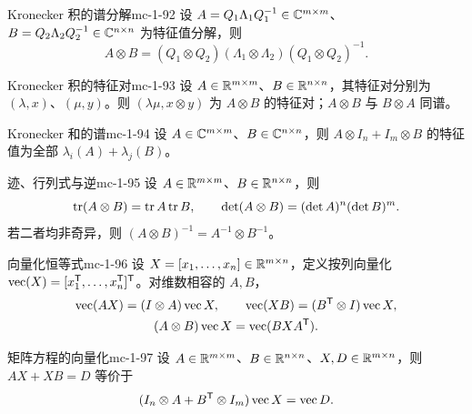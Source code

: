 \begin{corollary}{Kronecker 积的谱分解}{mc-1-92}
设 $A=Q_1\Lambda_1Q_1^{-1}\in\mathbb{C}^{m\times m}$、$B=Q_2\Lambda_2Q_2^{-1}\in\mathbb{C}^{n\times n}$ 为特征值分解，则
\[A\otimes B=(Q_1\otimes Q_2)(\Lambda_1\otimes\Lambda_2)(Q_1\otimes Q_2)^{-1}.\]
\end{corollary}

\begin{theorem}{Kronecker 积的特征对}{mc-1-93}
设 $A\in\mathbb{R}^{m\times m}$、$B\in\mathbb{R}^{n\times n}$，其特征对分别为 $(\lambda,x)$、$(\mu,y)$。则 $(\lambda\mu,x\otimes y)$ 为 $A\otimes B$ 的特征对；$A\otimes B$ 与 $B\otimes A$ 同谱。
\end{theorem}

\begin{corollary}{Kronecker 和的谱}{mc-1-94}
设 $A\in\mathbb{C}^{m\times m}$、$B\in\mathbb{C}^{n\times n}$，则 $A\otimes I_n+I_m\otimes B$ 的特征值为全部 $\lambda_i(A)+\lambda_j(B)$。
\end{corollary}

\begin{theorem}{迹、行列式与逆}{mc-1-95}
设 $A\in\mathbb{R}^{m\times m}$、$B\in\mathbb{R}^{n\times n}$，则
\[\operatorname{tr}(A\otimes B)=\operatorname{tr} A\operatorname{tr} B,\qquad\det(A\otimes B)=(\det A)^n(\det B)^m.\]
若二者均非奇异，则 $(A\otimes B)^{-1}=A^{-1}\otimes B^{-1}$。
\end{theorem}

\begin{theorem}{向量化恒等式}{mc-1-96}
设 $X=[x_1,\ldots,x_n]\in\mathbb{R}^{m\times n}$，定义按列向量化 $\operatorname{vec}(X)=[x_1^{\mathsf T},\ldots,x_n^{\mathsf T}]^{\mathsf T}$。对维数相容的 $A,B$，
\[
\begin{gathered}
\operatorname{vec}(AX)=(I\otimes A)\operatorname{vec} X,\qquad\operatorname{vec}(XB)=(B^{\mathsf T}\otimes I)\operatorname{vec} X,\\
(A\otimes B)\operatorname{vec} X=\operatorname{vec}(BXA^{\mathsf T}).
\end{gathered}
\]
\end{theorem}

\begin{theorem}{矩阵方程的向量化}{mc-1-97}
设 $A\in\mathbb{R}^{m\times m}$、$B\in\mathbb{R}^{n\times n}$、$X,D\in\mathbb{R}^{m\times n}$，则 $AX+XB=D$ 等价于
\[(I_n\otimes A+B^{\mathsf T}\otimes I_m)\operatorname{vec} X=\operatorname{vec} D.\]
\end{theorem}
